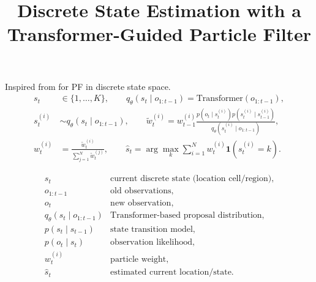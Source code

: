 \documentclass[a4paper]{article}
\title{Discrete State Estimation with a Transformer-Guided Particle Filter}
\date{}
\begin{document}
    \maketitle
    Inspired from \cite{chopin-2001-sequential-inference-and-state-number-determination-for-discrete-state-space-models-through-particle-filtering} for PF in discrete state space.
    \[
        \begin{aligned}
            s_t
            &\in
            \{1,\ldots,K\},
            \qquad
            q_{\theta}(s_t \mid o_{1:t-1})
            =
            \mathrm{Transformer}(o_{1:t-1}),
            \\[4pt]
            s_t^{(i)}
            &\sim
            q_{\theta}(s_t \mid o_{1:t-1}),
            \qquad
            \tilde{w}_t^{(i)}
            =
            w_{t-1}^{(i)}
            \frac{
                p(o_t \mid s_t^{(i)})
                p(s_t^{(i)} \mid s_{t-1}^{(i)})
            }{
                q_{\theta}(s_t^{(i)} \mid o_{1:t-1})
            },
            \\[4pt]
            w_t^{(i)}
            &=
            \frac{
                \tilde{w}_t^{(i)}
            }{
                \sum_{j=1}^{N}\tilde{w}_t^{(j)}
            },
            \qquad
            \hat{s}_t
            =
            \arg\max_{k}
            \sum_{i=1}^{N}
            w_t^{(i)}
            \mathbf{1}
            \left(
                s_t^{(i)}=k
            \right).
        \end{aligned}
    \]
    
    \[
        \begin{array}{ll}
            s_t & \text{current discrete state (location cell/region)}, \\
            o_{1:t-1} & \text{old observations}, \\
            o_t & \text{new observation}, \\
            q_{\theta}(s_t \mid o_{1:t-1}) & \text{Transformer-based proposal distribution}, \\
            p(s_t \mid s_{t-1}) & \text{state transition model}, \\
            p(o_t \mid s_t) & \text{observation likelihood}, \\
            w_t^{(i)} & \text{particle weight}, \\
            \hat{s}_t & \text{estimated current location/state}.
        \end{array}
    \]
%    
%    
\end{document}
